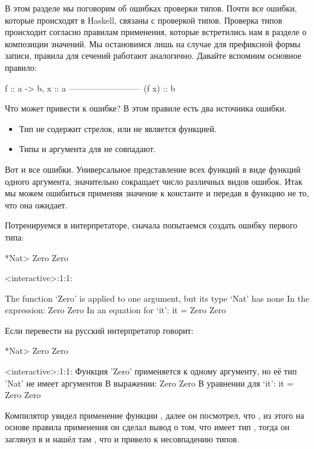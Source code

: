 В этом разделе мы поговорим об ошибках проверки типов. 
Почти все ошибки, которые происходят в Haskell, связаны с 
проверкой типов. Проверка типов происходит согласно правилам
применения, которые встретились нам в разделе о композиции 
значений. 
Мы остановимся лишь на случае для префиксной формы записи, 
правила для сечений работают аналогично. 
Давайте вспомним основное правило:

\begin{code}
                    f :: a -> b,       x :: a
                    --------------------------
                            (f x) :: b
\end{code}

Что может привести к ошибке? В этом правиле есть
два источника ошибки. 

\begin{itemize}
\item Тип  не содержит стрелок, или  не является функцией. 
\item Типы  и аргумента для  не совпадают.
\end{itemize}

Вот и все ошибки. Универсальное представление всех функций 
в виде функций одного аргумента, значительно сокращает число
различных видов ошибок. Итак мы можем ошибиться применяя
значение к константе и передав в функцию не то, что она
ожидает.

Потренируемся в интерпретаторе, сначала попытаемся
создать ошибку первого типа:

\begin{code}
*Nat> Zero Zero

<interactive>:1:1:

    The function `Zero' is applied to one argument,
    but its type `Nat' has none
    In the expression: Zero Zero
    In an equation for `it': it = Zero Zero
\end{code}

Если перевести на русский интерпретатор говорит: 

\begin{code}
*Nat> Zero Zero

<interactive>:1:1:
    Функция 'Zero' применяется к одному аргументу,
    но её тип 'Nat' не имеет аргументов
    В выражении: Zero Zero
    В уравнении для `it': it = Zero Zero
\end{code}

Компилятор увидел применение функции , далее он 
посмотрел, что , из этого на основе правила применения
он сделал вывод о том, что  имеет тип ,
тогда он заглянул в  и нашёл там , что
и привело к несовпадению типов. 

